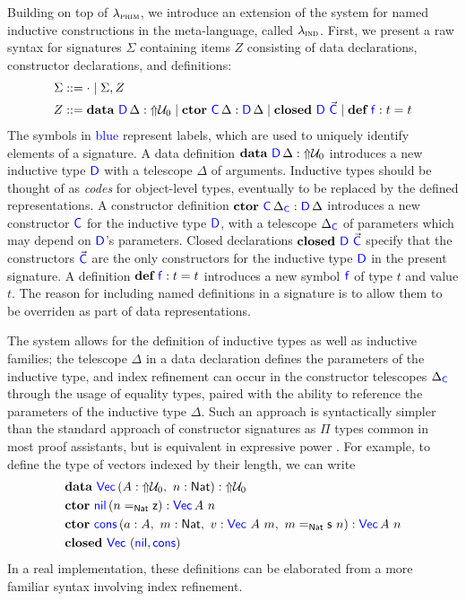 Building on top of $\lambda_{\textsc{prim}}$, we introduce an extension of the system for
named inductive constructions in the meta-language, called $\lambda_{\textsc{ind}}$. First,
we present a raw syntax for signatures $\Sigma$ containing items $Z$ consisting
of data declarations, constructor declarations, and definitions:
\begin{align*}
  \Sigma & ::= \cdot \mid \Sigma, Z                                                                                          \\
  Z      & ::= \textbf{data} \ {\color{blue}{\mathsf{D}}} \, {\Delta} : \text{$\Uparrow$}{\mathcal{U}_0} \mid \textbf{ctor} \ {\color{blue}{\mathsf{C}}} \, {\Delta} : {\color{blue}{\mathsf{D}}}\, {\Delta} \mid \textbf{closed}\ {\color{blue}{\mathsf{D}}} \ \vec{{\color{blue}{\mathsf{C}}}} \mid \textbf{def} \ {\color{blue}{\mathsf{f}}} : {t} = {t}
\end{align*}
The symbols in \textcolor{blue}{blue} represent labels, which are used to
uniquely identify elements of a signature. A data definition $\textbf{data} \ {\color{blue}{\mathsf{D}}} \, {\Delta} : \text{$\Uparrow$}{\mathcal{U}_0}$
introduces a new inductive type ${\color{blue}{\mathsf{D}}}$ with a telescope $\Delta$ of
arguments. Inductive types should be thought of as \emph{codes} for object-level
types, eventually to be replaced by the defined representations. A constructor
definition $\textbf{ctor} \ {\color{blue}{\mathsf{C}}} \, {\Delta_{{\color{blue}{\mathsf{C}}}}} : {\color{blue}{\mathsf{D}}}\, {\Delta}$ introduces a new constructor
${\color{blue}{\mathsf{C}}}$ for the inductive type ${\color{blue}{\mathsf{D}}}$, with a telescope $\Delta_{{\color{blue}{\mathsf{C}}}}$ of
parameters which may depend on ${\color{blue}{\mathsf{D}}}$'s parameters. Closed declarations
$\textbf{closed}\ {\color{blue}{\mathsf{D}}} \ \vec{{\color{blue}{\mathsf{C}}}}$ specify that the constructors $\vec{{\color{blue}{\mathsf{C}}}}$
are the only constructors for the inductive type ${\color{blue}{\mathsf{D}}}$ in the present
signature. A definition $\textbf{def} \ {\color{blue}{\mathsf{f}}} : {t} = {t}$ introduces a new symbol ${\color{blue}{\mathsf{f}}}$ of
type $t$ and value $t$. The reason for including named definitions in a
signature is to allow them to be overriden as part of data representations.

The system allows for the definition of inductive types as well as inductive
families; the telescope $\Delta$ in a data declaration defines the parameters
of the inductive type, and index refinement can occur in the constructor
telescopes $\Delta_{{\color{blue}{\mathsf{C}}}}$ through the usage of equality types, paired with the
ability to reference the parameters of the inductive type $\Delta$. Such an
approach is syntactically simpler than the standard approach of constructor
signatures as $\Pi$ types common in most proof assistants, but is equivalent in
expressive power \cite{Cockx2018-fk}. For example, to define the type of
vectors indexed by their length, we can write
\begin{align*}
   & \Sdata{Vec}{(A : \lift{\univ_0},\ n : \inte{Nat})}                                                         \\
   & \Sctor{nil}{(\Id{\inte{Nat}}{n}{\inte{z}})}{Vec}{A \ n}                                                    \\
   & \Sctor{cons}{(a : A,\ m : \inte{Nat},\ v : \lab{Vec}\ A\ m,\ \Id{\inte{Nat}}{m}{\inte{s}\ n})}{Vec}{A \ n} \\
   & \Sclosed{\lab{Vec}}{(\lab{nil}, \lab{cons})}
\end{align*}
In a real implementation, these definitions can be elaborated from a more
familiar syntax involving index refinement.

